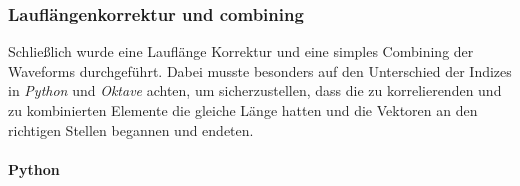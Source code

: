 \documentclass[11pt]{article}
\begin{document}
    \hypertarget{laufluxe4ngenkorrektur-und-combining}{%
\subsubsection{Lauflängenkorrektur und
combining}\label{laufluxe4ngenkorrektur-und-combining}}

Schließlich wurde eine Lauflänge Korrektur und eine simples Combining
der Waveforms durchgeführt. Dabei musste besonders auf den Unterschied
der Indizes in \emph{Python} und \emph{Oktave} achten, um
sicherzustellen, dass die zu korrelierenden und zu kombinierten Elemente
die gleiche Länge hatten und die Vektoren an den richtigen Stellen
begannen und endeten.

    \hypertarget{python}{%
\paragraph{Python}\label{python}}
\end{document}
